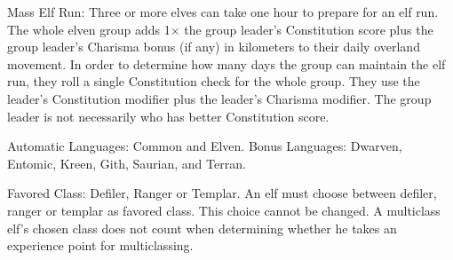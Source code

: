 \begin{itemize*}
    \item Mass Elf Run: Three or more elves can take one hour to prepare for an elf run. The whole elven group adds 1\onehalf $\times$ the group leader's Constitution score plus the group leader's Charisma bonus (if any) in kilometers to their daily overland movement. In order to determine how many days the group can maintain the elf run, they roll a single Constitution check for the whole group. They use the leader's Constitution modifier plus the leader's Charisma modifier. The group leader is not necessarily who has better Constitution score.
    \item Automatic Languages: Common and Elven. Bonus Languages: Dwarven, Entomic, Kreen, Gith, Saurian, and Terran.
    \item Favored Class: Defiler, Ranger or Templar. An elf must choose between defiler, ranger or templar as favored class. This choice cannot be changed. A multiclass elf's chosen class does not count when determining whether he takes an experience point for multiclassing.
\end{itemize*}